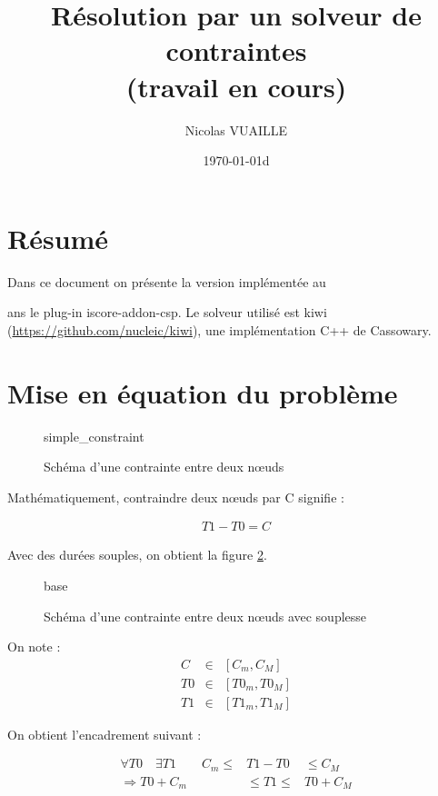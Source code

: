 \documentclass[10pt,a4paper]{article}
\author{Nicolas VUAILLE}
\title{Résolution par un solveur de contraintes \\ (travail en cours)}
\date{\today}
\begin{document}
\maketitle

\section*{Résumé}
Dans ce document on présente la version implémentée au \date dans le plug-in iscore-addon-csp. Le solveur utilisé est kiwi (\url{https://github.com/nucleic/kiwi}), une implémentation C++ de Cassowary.

\tableofcontents


\section{Mise en équation du problème}

	\begin{figure}[h]
		\centering
		
		\schemaScenario simple_constraint
		\caption{Schéma d'une contrainte entre deux nœuds}
		\label{S:simple}
	\end{figure}
	
Mathématiquement, contraindre deux n\oe{}uds par C signifie :

	\begin{eqnarray}
		T1 - T0 = C
	\end{eqnarray}
	
Avec des durées souples, on obtient la figure \ref{S:base}.
	\begin{figure}[h]
		\centering
		
		\schemaScenario base
		\caption{Schéma d'une contrainte entre deux nœuds avec souplesse}
		\label{S:base}
	\end{figure}
	
On note :
	\begin{eqnarray}
		C &\in& [C_m, C_M] \\
		T0 &\in& [T0_m, T0_M] \nonumber \\
		T1 &\in& [T1_m, T1_M] \nonumber
	\end{eqnarray}

On obtient l'encadrement suivant : 

	 \begin{eqnarray}
		 \forall T0 \quad \exists T1 \qquad C_m \leq& T1 - T0 &\leq C_M \\
		 \Rightarrow T0 + C_m &\leq T1 \leq& T0 + C_M \nonumber
	 \end{eqnarray}
\end{document}
